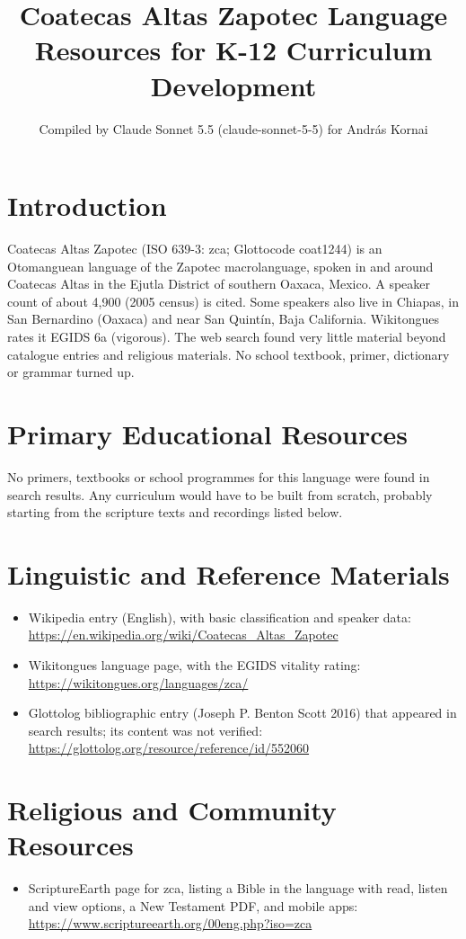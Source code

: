 \documentclass[12pt]{article}
\title{Coatecas Altas Zapotec Language Resources for K-12 Curriculum Development}
\author{Compiled by Claude Sonnet 5.5 (claude-sonnet-5-5) for Andr\'as Kornai}
\date{}
\begin{document}
\maketitle

\section{Introduction}
Coatecas Altas Zapotec (ISO 639-3: zca; Glottocode coat1244) is an Otomanguean language of the Zapotec macrolanguage, spoken in and around Coatecas Altas in the Ejutla District of southern Oaxaca, Mexico. A speaker count of about 4,900 (2005 census) is cited. Some speakers also live in Chiapas, in San Bernardino (Oaxaca) and near San Quint\'in, Baja California. Wikitongues rates it EGIDS 6a (vigorous). The web search found very little material beyond catalogue entries and religious materials. No school textbook, primer, dictionary or grammar turned up.

\section{Primary Educational Resources}
No primers, textbooks or school programmes for this language were found in search results. Any curriculum would have to be built from scratch, probably starting from the scripture texts and recordings listed below.

\section{Linguistic and Reference Materials}
\begin{itemize}
\item Wikipedia entry (English), with basic classification and speaker data: \url{https://en.wikipedia.org/wiki/Coatecas_Altas_Zapotec}
\item Wikitongues language page, with the EGIDS vitality rating: \url{https://wikitongues.org/languages/zca/}
\item Glottolog bibliographic entry (Joseph P. Benton Scott 2016) that appeared in search results; its content was not verified: \url{https://glottolog.org/resource/reference/id/552060}
\end{itemize}

\section{Religious and Community Resources}
\begin{itemize}
\item ScriptureEarth page for zca, listing a Bible in the language with read, listen and view options, a New Testament PDF, and mobile apps: \url{https://www.scriptureearth.org/00eng.php?iso=zca}
\end{itemize}
\end{document}
